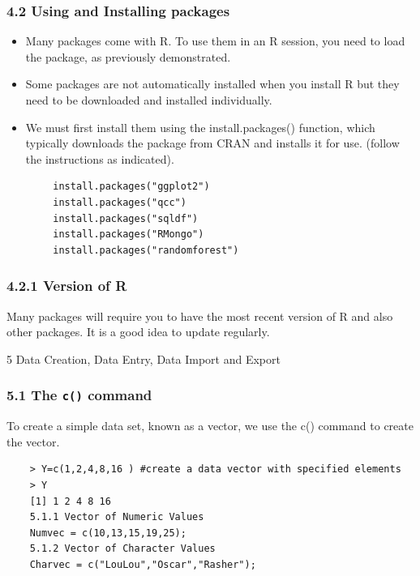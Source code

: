 \documentclass{beamer}
\begin{document}
\begin{frame}
\frametitle{4.2 Using and Installing packages}
\begin{itemize}
\item Many packages come with R. To use them in an R session, you need to load the package, as
	previously demonstrated.
\item Some packages are not automatically installed when you install R but they need to be downloaded
	and installed individually. 
\item We must first install them using the install.packages()
	function, which typically downloads the package from CRAN and installs it for use. (follow the
	instructions as indicated).
\end{itemize}
\end{frame}
\begin{frame}[fragile]
	\begin{framed}
		\begin{verbatim}
		install.packages("ggplot2")
		install.packages("qcc")
		install.packages("sqldf")
		install.packages("RMongo")
		install.packages("randomforest")
		\end{verbatim}
	\end{framed}
	
\end{frame}
\begin{frame}
\frametitle{4.2.1 Version of R}
	Many packages will require you to have the most recent version of R and also other packages.
	It is a good idea to update regularly.
\end{frame}
\begin{frame}
	5 Data Creation, Data Entry, Data Import and Export
\end{frame}
\begin{frame}[fragile]
\frametitle{5.1 The \texttt{c()} command}
	To create a simple data set, known as a vector, we use the c() command to create the vector.
\begin{framed}
\begin{verbatim}
	> Y=c(1,2,4,8,16 ) #create a data vector with specified elements
	> Y
	[1] 1 2 4 8 16
	5.1.1 Vector of Numeric Values
	Numvec = c(10,13,15,19,25);
	5.1.2 Vector of Character Values
	Charvec = c("LouLou","Oscar","Rasher");
\end{verbatim}
\end{framed}
	
\end{frame}
\end{document}
